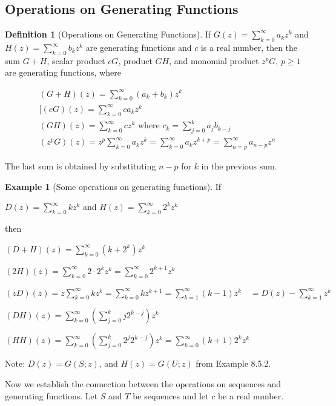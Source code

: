 \documentclass[10pt,]{book}
\theoremstyle{plain}
\theoremstyle{definition}
\newtheorem{definition}[theorem]{Definition}
\theoremstyle{definition}
\theoremstyle{definition}
\newtheorem{example}[theorem]{Example}
\theoremstyle{definition}
\numberwithin{equation}{section}
\begin{document}
\subsection[Operations on Generating Functions]{Operations on Generating Functions}\label{sss-operations-on-generating-functions}
\begin{definition}[Operations on Generating Functions]\label{definition-8}
If  \(G(z)=\sum_{k=0}^{\infty} a_k z^k\) and \(H(z) =\sum_{k=0}^{\infty} b_k z^k\)
are generating functions and \(c\) is a real number, then the sum \(G + H\), scalar product \(c G\), product \(G H\), and monomial product \(z^p G\), \(p \geq  1\) are generating functions, where

\begin{gather}
(G + H)(z)=\sum_{k=0}^{\infty} (a_k+b_k) z^k\label{gf-sum}\\
[(c G)(z)=\sum_{k=0}^{\infty} c a_k z^k\label{gf-scalarmult}\\
(G H)(z) = \sum_{k=0}^{\infty} c z^k \textrm{ where } c_k= \sum_{j=0}^k a_jb_{k-j}\label{gf-product}\\
(z^p G)(z) = z^p\sum_{k=0}^{\infty} a_k z^k=\sum_{k=0}^{\infty} a_k z^{k+p} = \sum_{n=p}^{\infty} a_{n-p} z^n\label{gf-shift}
\end{gather}
%
\par
The last sum is obtained by substituting \(n - p\) for \(k\) in the previous sum.%
\end{definition}
\begin{example}[Some operations on generating functions]\label{ex-some-gf-operations}
If

\(D(z) =\sum_{k=0}^{\infty} kz^k\) and \(H(z) =\sum_{k=0}^{\infty} 2^k z^k\) 

then

\((D + H)(z) =\sum_{k=0}^{\infty} (k+2^k) z^k\) 

\((2H)(z)= \sum_{k=0}^{\infty} 2\cdot 2^kz^k =\sum_{k=0}^{\infty} 2^{k+1}z^k\)

 \((z D)(z) = z\sum_{k=0}^{\infty} kz^k= \sum_{k=0}^{\infty} kz^{k+1}= \sum_{k=1}^{\infty} (k-1)
z^k \quad = D(z)- \sum_{k=1}^{\infty} z^k\)

\((D H)(z)=\sum_{k=0}^{\infty} (\sum_{j=0}^k j 2^{k-j})z^k\)

\((H H)(z)= \sum_{k=0}^{\infty} (\sum_{j=0}^k 2^j2^{k-j}) z^k=\sum_{k=0}^{\infty} (k+1)2^k z^k\)%
\par
Note: \(D(z) = G(S;z)\), and \(H(z) = G(U;z)\) from Example 8.5.2.%
\end{example}
Now we establish the connection between the operations on sequences and generating
functions. Let \(S\) and \(T\) be sequences and let \(c\) be a real number.
\end{document}
